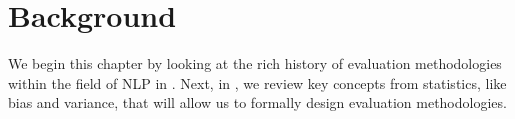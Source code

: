 
\chapter{\label{chap:setup} Background}
We begin this chapter by looking at the rich history of evaluation methodologies within the field of NLP in .
Next, in , we review key concepts from statistics, like bias and variance, that will allow us to formally design evaluation methodologies.



